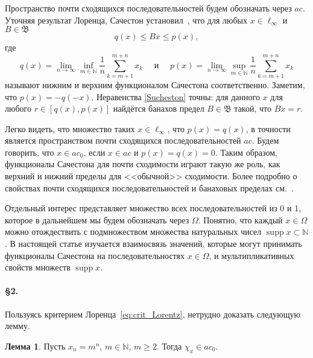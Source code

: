 \documentclass[a4paper,openbib]{article}
\DeclareMathOperator{\supp}{supp}
\theoremstyle{definition}
\newtheorem{lemma}{Лемма}
\begin{document}
Пространство почти сходящихся последовательностей будем обозначать через $ac$.
%
Уточняя результат Лоренца, Сачестон установил~\cite{sucheston1967banach}, что
для любых $x\in \ell_\infty$ и $B\in\mathfrak{B}$
\begin{equation}\label{Sucheston}
	q(x) \leqslant Bx \leqslant p(x)
	,
\end{equation}
где
\begin{equation*}
	q(x) = \lim_{n\to\infty} \inf_{m\in\mathbb{N}}  \frac{1}{n} \sum_{k=m+1}^{m+n} x_k
	\mbox{~~~~и~~~~}
	p(x) = \lim_{n\to\infty} \sup_{m\in\mathbb{N}}  \frac{1}{n} \sum_{k=m+1}^{m+n} x_k
\end{equation*}
называют нижним и верхним функционалом Сачестона соответственно.
Заметим, что $p(x) = -q(-x)$.
Неравенства \eqref{Sucheston} точны:
для данного $x$ для любого $r\in[q(x), p(x)]$ найдётся банахов предел
$B\in\mathfrak{B}$ такой, что $Bx = r$.

Легко видеть, что множество таких $x\in\ell_\infty$, что $p(x)=q(x)$,
в точности является пространством почти сходящихся последовательностей $ac$.
Будем говорить, что $x\in ac_0$, если $x\in ac$ и $p(x)=q(x)=0$.
Таким образом, функционалы Сачестона для почти сходимости играют такую же роль,
как верхний и нижний пределы для <<обычной>> сходимости.
Более подробно о свойствах почти сходящихся последовательностей и банаховых пределах см.~\cite{semenov2020geomBL}.


Отдельный интерес представляет множество всех последовательностей из 0 и 1,
которое в дальнейшем мы будем обозначать через $\Omega$.
Понятно, что каждый $x\in \Omega$ можно отождествить с подмножеством множества натуральных чисел
$\supp x \subset \mathbb{N}$.
%
В настоящей статье изучается взаимосвязь значений, которые могут принимать функционалы Сачестона
на последовательностях $x\in \Omega$, и мультипликативных свойств множеств $\supp x$.


\paragraph{\S 2.}

Пользуясь критерием Лоренца~\eqref{eq:crit_Lorentz},
нетрудно доказать следующую лемму.

\begin{lemma}
	\label{lem:simple_powers_in_ac0}
	Пусть $x_n = m^n$, $m\in\mathbb{N}$, $m\geq 2$.
	Тогда
	$
		\chi_x \in ac_0
		.
	$
\end{lemma}
\end{document}
